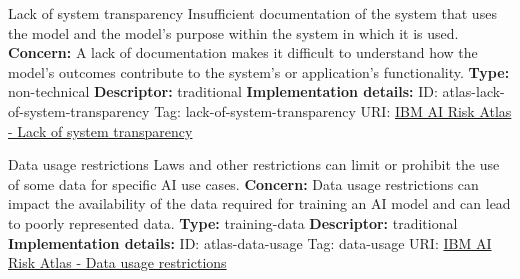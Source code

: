 \documentclass[a4paper,12pt]{article}
\begin{document}
\begin{definitionbox}{Lack of system transparency}
Insufficient documentation of the system that uses the model and the model's purpose within the system in which it is used.\newline\newline
\textbf{Concern: }A lack of documentation makes it difficult to understand how the model's outcomes contribute to the system's or application's functionality.\newline\newline
\textbf{Type: }non-technical\newline
\textbf{Descriptor: }traditional \newline\newline
\textbf{Implementation details: } \newline
ID: atlas-lack-of-system-transparency \newline
Tag: lack-of-system-transparency \newline
URI:  \href{https://www.ibm.com/docs/en/watsonx/saas?topic=SSYOK8/wsj/ai-risk-atlas/lack-of-system-transparency.html}{IBM AI Risk Atlas - Lack of system transparency}\newline
\end{definitionbox}
\begin{definitionbox}{Data usage restrictions}
Laws and other restrictions can limit or prohibit the use of some data for specific AI use cases.\newline\newline
\textbf{Concern: }Data usage restrictions can impact the availability of the data required for training an AI model and can lead to poorly represented data.\newline\newline
\textbf{Type: }training-data\newline
\textbf{Descriptor: }traditional \newline\newline
\textbf{Implementation details: } \newline
ID: atlas-data-usage \newline
Tag: data-usage \newline
URI:  \href{https://www.ibm.com/docs/en/watsonx/saas?topic=SSYOK8/wsj/ai-risk-atlas/data-usage.html}{IBM AI Risk Atlas - Data usage restrictions}\newline
\end{definitionbox}
\end{document}
